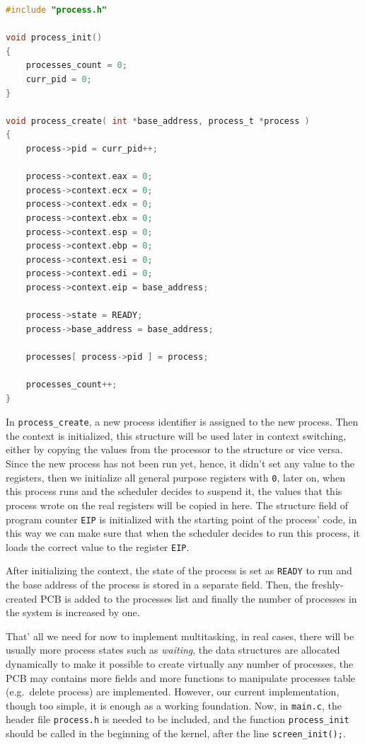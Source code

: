 \begin{lstlisting}[language=C]
#include "process.h"

void process_init()
{
    processes_count = 0;
    curr_pid = 0;
}

void process_create( int *base_address, process_t *process )
{   
    process->pid = curr_pid++;
    
    process->context.eax = 0;
    process->context.ecx = 0;
    process->context.edx = 0;
    process->context.ebx = 0;
    process->context.esp = 0;
    process->context.ebp = 0;
    process->context.esi = 0;
    process->context.edi = 0;
    process->context.eip = base_address;
    
    process->state = READY;
    process->base_address = base_address;
    
    processes[ process->pid ] = process;
    
    processes_count++;
}
\end{lstlisting}

In \lstinline!process_create!, a new process identifier is assigned to
the new process. Then the context is initialized, this structure will be
used later in context switching, either by copying the values from the
processor to the structure or vice versa. Since the new process has not
been run yet, hence, it didn't set any value to the registers, then we
initialize all general purpose registers with \lstinline!0!, later on,
when this process runs and the scheduler decides to suspend it, the
values that this process wrote on the real registers will be copied in
here. The structure field of program counter \lstinline!EIP! is
initialized with the starting point of the process' code, in this way we
can make sure that when the scheduler decides to run this process, it
loads the correct value to the register \lstinline!EIP!.

After initializing the context, the state of the process is set as
\lstinline!READY! to run and the base address of the process is stored
in a separate field. Then, the freshly-created PCB is added to the
processes list and finally the number of processes in the system is
increased by one.

That' all we need for now to implement multitasking, in real cases,
there will be usually more process states such as \emph{waiting}, the
data structures are allocated dynamically to make it possible to create
virtually any number of processes, the PCB may contains more fields and
more functions to manipulate processes table (e.g.~delete process) are
implemented. However, our current implementation, though too simple, it
is enough as a working foundation. Now, in \lstinline!main.c!, the
header file \lstinline!process.h! is needed to be included, and the
function \lstinline!process_init! should be called in the beginning of
the kernel, after the line \lstinline!screen_init();!.

